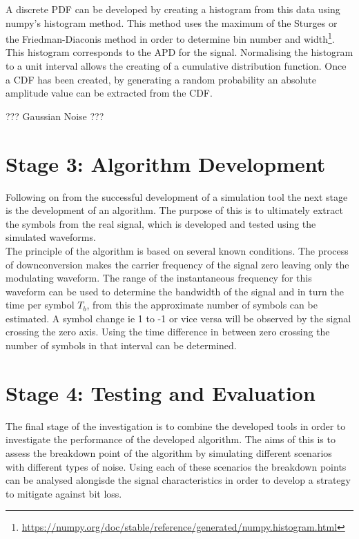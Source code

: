 A discrete PDF can be developed by creating a histogram from this data using numpy's histogram method. This method uses the maximum of the Sturges or the Friedman-Diaconis method in order to determine bin number and width\footnote{\hyperlink{https://numpy.org/doc/stable/reference/generated/numpy.histogram.html}{https://numpy.org/doc/stable/reference/generated/numpy.histogram.html}}.
This histogram corresponds to the APD for the signal. Normalising the histogram to a unit interval allows the creating of a cumulative distribution function. Once a CDF has been created, by generating a random probability an absolute amplitude value can be extracted from the CDF.

??? Gaussian Noise ???
\section{Stage 3: Algorithm Development}
Following on from the successful development of a simulation tool the next stage is the development of an algorithm. The purpose of this is to ultimately extract the symbols from the real signal, which is developed and tested using the simulated waveforms.
\\
The principle of the algorithm is based on several known conditions. The process of downconversion makes the carrier frequency of the signal zero leaving only the modulating waveform. The range of the instantaneous frequency for this waveform can be used to determine the bandwidth of the signal and in turn the time per symbol $T_b$, from this the approximate number of symbols can be estimated. A symbol change ie 1 to -1 or vice versa will be observed by the signal crossing the zero axis. Using the time difference in between zero crossing the number of symbols in that interval can be determined. 

\section{Stage 4: Testing and Evaluation}
The final stage of the investigation is to combine the developed tools in order to investigate the performance of the developed algorithm. The aims of this is to assess the breakdown point of the algorithm by simulating different scenarios with different types of noise. Using each of these scenarios the breakdown points can be analysed alongisde the signal characteristics in order to develop a strategy to mitigate against bit loss.
